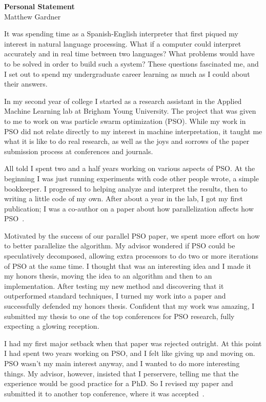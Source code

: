 \documentclass[onecolumn, 12pt]{article}
\title{}
\author{}
\date{}
\begin{document}
\pagestyle{empty}

\begin{center}
  \textbf{Personal Statement}\\
  Matthew Gardner
\end{center}

It was spending time as a Spanish-English interpreter that first piqued my
interest in natural language processing.  What if a computer could interpret
accurately and in real time between two languages?  What problems would have to
be solved in order to build such a system?  These questions fascinated me, and
I set out to spend my undergraduate career learning as much as I could about
their answers.

In my second year of college I started as a research assistant in the Applied
Machine Learning lab at Brigham Young University.  The project that was given
to me to work on was particle swarm optimization (PSO).  While my work in PSO
did not relate directly to my interest in machine interpretation, it taught me
what it is like to do real research, as well as the joys and sorrows of the
paper submission process at conferences and journals.

All told I spent two and a half years working on various aspects of PSO.  At
the beginning I was just running experiments with code other people wrote, a
simple bookkeeper.  I progressed to helping analyze and interpret the results,
then to writing a little code of my own.  After about a year in the lab, I got
my first publication; I was a co-author on a paper about how parallelization
affects how PSO~\cite{mcnabb-2009-large-particle-swarms}.  

Motivated by the success of our parallel PSO paper, we spent more effort on how
to better parallelize the algorithm.  My advisor wondered if PSO could be
speculatively decomposed, allowing extra processors to do two or more
iterations of PSO at the same time.  I thought that was an interesting idea and
I made it my honors thesis, moving the idea to an algorithm and then to an
implementation.  After testing my new method and discovering that it
outperformed standard techniques, I turned my work into a paper and
successfully defended my honors thesis.  Confident that my work was amazing, I
submitted my thesis to one of the top conferences for PSO research, fully
expecting a glowing reception.

I had my first major setback when that paper was rejected outright.  At this
point I had spent two years working on PSO, and I felt like giving up and
moving on.  PSO wasn't my main interest anyway, and I wanted to do more
interesting things.  My advisor, however, insisted that I perservere, telling
me that the experience would be good practice for a PhD.  So I revised my paper
and submitted it to another top conference, where it was
accepted~\cite{gardner-2010-speculative-evaluation-in-pso}.
\end{document}
